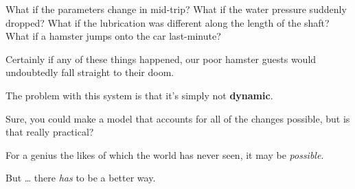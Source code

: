 \documentclass[]{article}
\begin{document}
What if the parameters change in mid-trip? What if the water pressure
suddenly dropped? What if the lubrication was different along the length
of the shaft? What if a hamster jumps onto the car last-minute?

Certainly if any of these things happened, our poor hamster guests would
undoubtedly fall straight to their doom.

The problem with this system is that it's simply not \textbf{dynamic}.

Sure, you could make a model that accounts for all of the changes
possible, but is that really practical?

For a genius the likes of which the world has never seen, it may be
\emph{possible}.

But \ldots{} there \emph{has} to be a better way.
\end{document}
